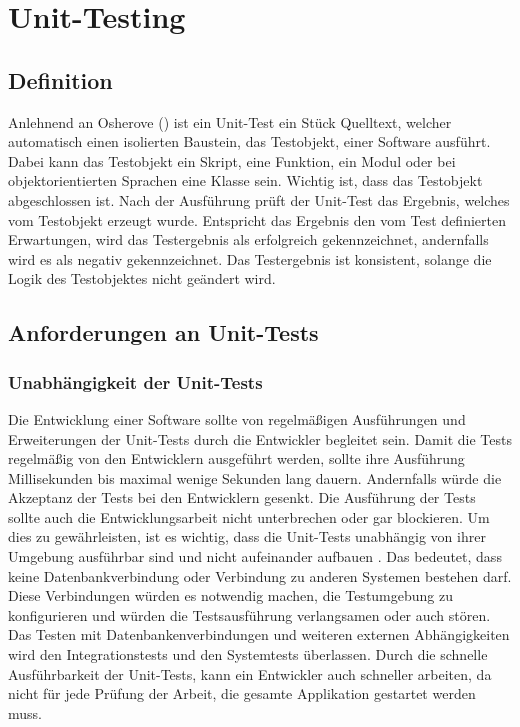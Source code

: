\section{Unit-Testing}
\subsection{Definition}
Anlehnend an Osherove (\citeyear[S. 34]{Osherove2015}) ist ein Unit-Test ein Stück Quelltext, welcher automatisch einen isolierten Baustein, das Testobjekt, einer Software ausführt. Dabei kann das Testobjekt ein Skript, eine Funktion, ein Modul oder bei objektorientierten Sprachen eine Klasse sein. Wichtig ist, dass das Testobjekt abgeschlossen ist. Nach der Ausführung prüft der Unit-Test das Ergebnis, welches vom Testobjekt erzeugt wurde. Entspricht das Ergebnis den vom Test definierten Erwartungen, wird das Testergebnis als erfolgreich gekennzeichnet, andernfalls wird es als negativ gekennzeichnet.
Das Testergebnis ist konsistent, solange die Logik des Testobjektes nicht geändert wird.

\subsection{Anforderungen an Unit-Tests}
\subsubsection*{Unabhängigkeit der Unit-Tests}
Die Entwicklung einer Software sollte von regelmäßigen Ausführungen und Erweiterungen der Unit-Tests durch die Entwickler begleitet sein. Damit die Tests regelmäßig von den Entwicklern ausgeführt werden, sollte ihre Ausführung Millisekunden bis maximal wenige Sekunden lang dauern. Andernfalls würde die Akzeptanz der Tests bei den Entwicklern gesenkt. Die Ausführung der Tests sollte auch die Entwicklungsarbeit nicht unterbrechen oder gar blockieren. Um dies zu gewährleisten, ist es wichtig, dass die Unit-Tests unabhängig von ihrer Umgebung ausführbar sind und nicht aufeinander aufbauen \autocite[vgl.][S. 19]{Springer2015}. Das bedeutet, dass keine Datenbankverbindung oder Verbindung zu anderen Systemen bestehen darf. Diese Verbindungen würden es notwendig machen, die Testumgebung zu konfigurieren und würden die Testsausführung verlangsamen oder auch stören. Das Testen mit Datenbankenverbindungen und weiteren externen Abhängigkeiten wird den Integrationstests und den Systemtests überlassen.
Durch die schnelle Ausführbarkeit der Unit-Tests, kann ein Entwickler auch schneller arbeiten, da nicht für jede Prüfung der Arbeit, die gesamte Applikation gestartet werden muss.
